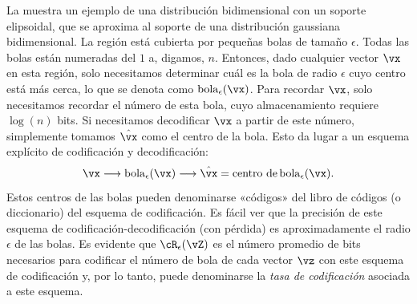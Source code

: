 \documentclass[../../book-main.tex]{subfiles}
\begin{document}
\begin{example}
    La  muestra un ejemplo de una distribución bidimensional
    con un soporte elipsoidal, que se aproxima al soporte de una distribución gaussiana
    bidimensional. La región está cubierta por pequeñas bolas de
    tamaño $\epsilon$. Todas las bolas están numeradas del $1$ a, digamos, $n$.
    Entonces, dado cualquier vector $\vx$ en esta región,
    solo necesitamos determinar cuál es la bola de radio $\epsilon$ cuyo centro está
    más cerca, lo que se denota como $\operatorname{bola}_{\epsilon}(\vx)$. Para
    recordar $\vx$, solo necesitamos recordar el número de esta bola,
    cuyo almacenamiento requiere $\log(n)$ bits. Si necesitamos decodificar $\vx$
    a partir de este número, simplemente tomamos $\hat \vx$ como el centro de la
    bola. Esto da lugar a un esquema explícito de codificación y decodificación:
    \begin{equation}
        \vx \longrightarrow \operatorname{bola}_{\epsilon}(\vx)
        \longrightarrow \hat \vx = \mbox{centro de}
        \operatorname{bola}_{\epsilon}(\vx).
    \end{equation}
    Estos centros de las bolas pueden denominarse «códigos» del libro de códigos 
    (o diccionario) del esquema de codificación. Es fácil ver que
    la precisión de este esquema de codificación-decodificación (con pérdida) es aproximadamente
    el radio $\epsilon$ de las bolas.
    Es evidente que $\cR_{\epsilon}(\vZ)$ es el número promedio
    de bits necesarios para codificar el número de bola de cada vector $\vz$ con
    este esquema de codificación y, por lo tanto, puede denominarse la {\em tasa de codificación}
    asociada a este esquema.
\end{example}
\end{document}
